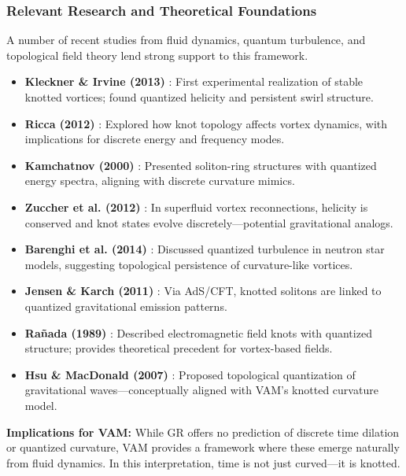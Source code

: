 \documentclass[a4paper, aps,preprint,superscriptaddress, 12pt]{revtex4}
\begin{document}
\subsubsection{Relevant Research and Theoretical Foundations}

A number of recent studies from fluid dynamics, quantum turbulence, and topological field theory lend strong support to this framework.

\begin{itemize}
    \item \textbf{Kleckner \& Irvine (2013)} \cite{kleckner2013}: First experimental realization of stable knotted vortices; found quantized helicity and persistent swirl structure.

    \item \textbf{Ricca (2012)} \cite{ricca2012}: Explored how knot topology affects vortex dynamics, with implications for discrete energy and frequency modes.

    \item \textbf{Kamchatnov (2000)} \cite{kamchatnov2000}: Presented soliton-ring structures with quantized energy spectra, aligning with discrete curvature mimics.

    \item \textbf{Zuccher et al. (2012)} \cite{zuccher2012}: In superfluid vortex reconnections, helicity is conserved and knot states evolve discretely—potential gravitational analogs.

    \item \textbf{Barenghi et al. (2014)} \cite{barenghi2014}: Discussed quantized turbulence in neutron star models, suggesting topological persistence of curvature-like vortices.

    \item \textbf{Jensen \& Karch (2011)} \cite{jensen2011}: Via AdS/CFT, knotted solitons are linked to quantized gravitational emission patterns.

    \item \textbf{Rañada (1989)} \cite{ranada1989}: Described electromagnetic field knots with quantized structure; provides theoretical precedent for vortex-based fields.

    \item \textbf{Hsu \& MacDonald (2007)} \cite{hsu2007}: Proposed topological quantization of gravitational waves—conceptually aligned with VAM's knotted curvature model.
\end{itemize}

\textbf{Implications for VAM:} While GR offers no prediction of discrete time dilation or quantized curvature, VAM provides a framework where these emerge naturally from fluid dynamics. In this interpretation, time is not just curved—it is knotted.
\end{document}
